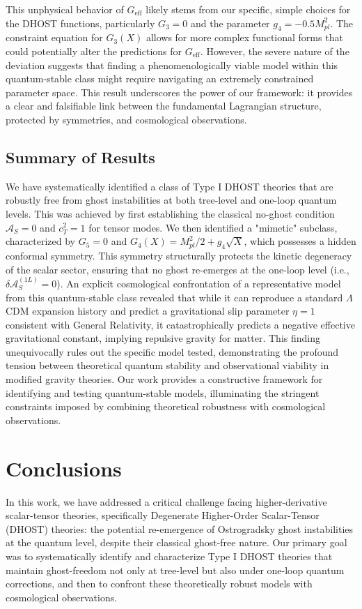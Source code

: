 \documentclass[twocolumn]{aastex631}
\begin{document}
This unphysical behavior of $G_{\text{eff}}$ likely stems from our specific, simple choices for the DHOST functions, particularly $G_3=0$ and the parameter $g_4 = -0.5 M_{pl}^2$. The constraint equation for $G_3(X)$ allows for more complex functional forms that could potentially alter the predictions for $G_{\text{eff}}$. However, the severe nature of the deviation suggests that finding a phenomenologically viable model within this quantum-stable class might require navigating an extremely constrained parameter space. This result underscores the power of our framework: it provides a clear and falsifiable link between the fundamental Lagrangian structure, protected by symmetries, and cosmological observations.

\subsection{Summary of Results}
We have systematically identified a class of Type I DHOST theories that are robustly free from ghost instabilities at both tree-level and one-loop quantum levels. This was achieved by first establishing the classical no-ghost condition $\mathcal{A}_S=0$ and $c_T^2=1$ for tensor modes. We then identified a "mimetic" subclass, characterized by $G_5=0$ and $G_4(X) = M_{pl}^2/2 + g_4\sqrt{X}$, which possesses a hidden conformal symmetry. This symmetry structurally protects the kinetic degeneracy of the scalar sector, ensuring that no ghost re-emerges at the one-loop level (i.e., $\delta\mathcal{A}_S^{(1L)}=0$). An explicit cosmological confrontation of a representative model from this quantum-stable class revealed that while it can reproduce a standard $\Lambda$CDM expansion history and predict a gravitational slip parameter $\eta=1$ consistent with General Relativity, it catastrophically predicts a negative effective gravitational constant, implying repulsive gravity for matter. This finding unequivocally rules out the specific model tested, demonstrating the profound tension between theoretical quantum stability and observational viability in modified gravity theories. Our work provides a constructive framework for identifying and testing quantum-stable models, illuminating the stringent constraints imposed by combining theoretical robustness with cosmological observations.

\section{Conclusions}
\label{sec:conclusions}
In this work, we have addressed a critical challenge facing higher-derivative scalar-tensor theories, specifically Degenerate Higher-Order Scalar-Tensor (DHOST) theories: the potential re-emergence of Ostrogradsky ghost instabilities at the quantum level, despite their classical ghost-free nature. Our primary goal was to systematically identify and characterize Type I DHOST theories that maintain ghost-freedom not only at tree-level but also under one-loop quantum corrections, and then to confront these theoretically robust models with cosmological observations.
\end{document}
